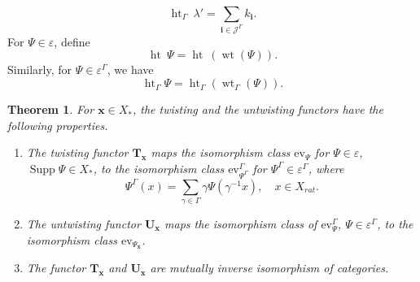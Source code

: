 \documentclass[11pt]{amsart}
\theoremstyle{plain}
\newtheorem{thm}{Theorem}[section]
\theoremstyle{definition}
\DeclareMathOperator{\Supp}{Supp}
\DeclareMathOperator{\het}{ht}
\DeclareMathOperator{\wt}{wt}
\begin{document}
\begin{equation*}
\het_{\Gamma}\ \lambda'=\sum_{\textbf{i}\in\mathcal{J}^{\Gamma}}k_{\textbf{i}}.
\end{equation*}
For $\Psi\in\varepsilon$, define
\begin{equation}
    \het\ \Psi=\het\ (\wt(\Psi)).
\end{equation}
Similarly, for $\Psi\in\varepsilon^{\Gamma}$, we have
\begin{equation}
    \het_{\Gamma}\Psi=\het_{\Gamma}(\wt_{\Gamma}(\Psi)).
\end{equation}
\begin{thm}\label{thm:3}
    For $\mathbf{x}\in X_{*}$, the twisting and the untwisting functors have the following properties.
    \begin{enumerate}[label=(\alph*)]
        \item The twisting functor $\textbf{T}_{\mathbf{x}}$ maps the isomorphism class $\mbox{ev}_{\Psi}$ for $\Psi\in\varepsilon$, $\Supp\Psi\in X_{*}$, to the isomorphism class $\mbox{ev}^{\Gamma}_{\Psi^{\Gamma}}$ for  $\Psi^{\Gamma}\in\varepsilon^{\Gamma}$, where
        \begin{equation*}
            \Psi^{\Gamma}(x)=\sum_{\gamma\in\Gamma}\gamma \Psi(\gamma^{-1}x),\quad x\in X_{rat}.
        \end{equation*}
        \item The untwisting functor $\textbf{U}_{\mathbf{x}}$ maps the isomorphism class of $\mbox{ev}^{\Gamma}_{\Psi}$, $\Psi\in\varepsilon^{\Gamma}$, to the isomorphism class $\mbox{ev}_{\Psi_{\mathbf{x}}}$.
        \item The functor $\textbf{T}_{\mathbf{x}}$ and $\textbf{U}_{\mathbf{x}}$ are mutually inverse isomorphism of categories.
    \end{enumerate}
\end{thm}
\end{document}
